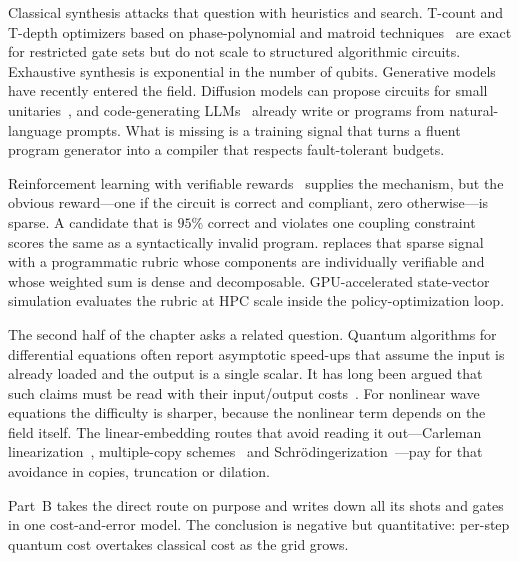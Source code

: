 Classical synthesis attacks that question with heuristics and search. T-count and T-depth optimizers based on phase-polynomial and matroid techniques~\cite{amy2014tpar} are exact for restricted gate sets but do not scale to structured algorithmic circuits. Exhaustive synthesis is exponential in the number of qubits. Generative models have recently entered the field. Diffusion models can propose circuits for small unitaries~\cite{furrutter2024genqc}, and code-generating LLMs~\cite{chen2021codex} already write \qiskit{} or \cudaq{} programs from natural-language prompts. What is missing is a training signal that turns a fluent program generator into a compiler that respects fault-tolerant budgets.

Reinforcement learning with verifiable rewards~\cite{deepseek2025r1} supplies the mechanism, but the obvious reward---one if the circuit is correct and compliant, zero otherwise---is sparse. A candidate that is $95\%$ correct and violates one coupling constraint scores the same as a syntactically invalid program. \rubriq{} replaces that sparse signal with a programmatic rubric whose components are individually verifiable and whose weighted sum is dense and decomposable. GPU-accelerated state-vector simulation evaluates the rubric at HPC scale inside the policy-optimization loop.

The second half of the chapter asks a related question. Quantum algorithms for differential equations often report asymptotic speed-ups that assume the input is already loaded and the output is a single scalar. It has long been argued that such claims must be read with their input/output costs~\cite{aaronson2015fineprint}. For nonlinear wave equations the difficulty is sharper, because the nonlinear term depends on the field itself. The linear-embedding routes that avoid reading it out---Carleman linearization~\cite{liu2021carleman}, multiple-copy schemes~\cite{lloyd2020nonlinear} and Schr\"odingerization~\cite{jin2024schrodingerization}---pay for that avoidance in copies, truncation or dilation.

Part~B takes the direct route on purpose and writes down all its shots and gates in one cost-and-error model. The conclusion is negative but quantitative: per-step quantum cost overtakes classical cost as the grid grows.

